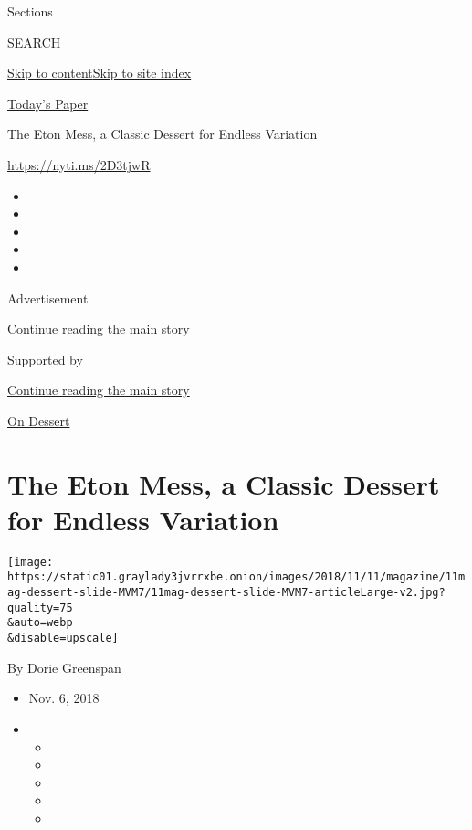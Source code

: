 Sections

SEARCH

\protect\hyperlink{site-content}{Skip to
content}\protect\hyperlink{site-index}{Skip to site index}

\href{https://myaccount.nytimes3xbfgragh.onion/auth/login?response_type=cookie\&client_id=vi}{}

\href{https://www.nytimes3xbfgragh.onion/section/todayspaper}{Today's
Paper}

The Eton Mess, a Classic Dessert for Endless Variation

\url{https://nyti.ms/2D3tjwR}

\begin{itemize}
\item
\item
\item
\item
\item
\end{itemize}

Advertisement

\protect\hyperlink{after-top}{Continue reading the main story}

Supported by

\protect\hyperlink{after-sponsor}{Continue reading the main story}

\href{/column/on-dessert}{On Dessert}

\hypertarget{the-eton-mess-a-classic-dessert-for-endless-variation}{%
\section{The Eton Mess, a Classic Dessert for Endless
Variation}\label{the-eton-mess-a-classic-dessert-for-endless-variation}}

\texttt{[image: https://static01.graylady3jvrrxbe.onion/images/2018/11/11/magazine/11mag-dessert-slide-MVM7/11mag-dessert-slide-MVM7-articleLarge-v2.jpg?quality=75\\\&auto=webp\\\&disable=upscale]}

By Dorie Greenspan

\begin{itemize}
\item
  Nov. 6, 2018
\item
  \begin{itemize}
  \item
  \item
  \item
  \item
  \item
  \end{itemize}
\end{itemize}

